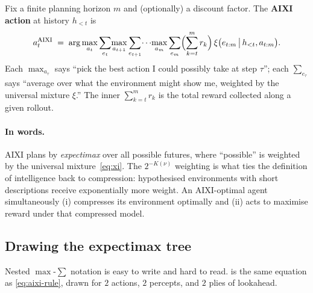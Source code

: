 \begin{definition}[AIXI]
\label{def:aixi}
Fix a finite planning horizon $m$ and (optionally) a discount factor.
The \textbf{AIXI action} at history $h_{<t}$ is
\begin{equation}
  a_t^{\mathrm{AIXI}}
  \;=\; \arg\max_{a_t}
        \sum_{e_t}\!\max_{a_{t+1}}\sum_{e_{t+1}}\!\cdots\!\max_{a_m}\sum_{e_m}
        \Bigl(\sum_{k=t}^{m} r_k\Bigr)\,
        \xi\bigl(e_{t:m}\,\big|\,h_{<t}, a_{t:m}\bigr).
  \label{eq:aixi-rule}
\end{equation}
Each $\max_{a_\tau}$ says ``pick the best action I could possibly take
at step $\tau$''; each $\sum_{e_\tau}$ says ``average over what the
environment might show me, weighted by the universal mixture $\xi$.''
The inner $\sum_{k=t}^{m} r_k$ is the total reward collected along a
given rollout.
\end{definition}

\paragraph{In words.}  AIXI plans by \emph{expectimax} over all
possible futures, where ``possible'' is weighted by the universal
mixture~\eqref{eq:xi}.  The $2^{-K(\nu)}$ weighting is what ties the
definition of intelligence back to compression: hypothesised
environments with short descriptions receive exponentially more
weight.  An AIXI-optimal agent simultaneously (i) compresses its
environment optimally and (ii) acts to maximise reward under that
compressed model.

\subsection*{Drawing the expectimax tree}

Nested $\max$-$\sum$ notation is easy to write and hard to read.
 is the same equation as \eqref{eq:aixi-rule},
drawn for $2$ actions, $2$ percepts, and $2$ plies of lookahead.

